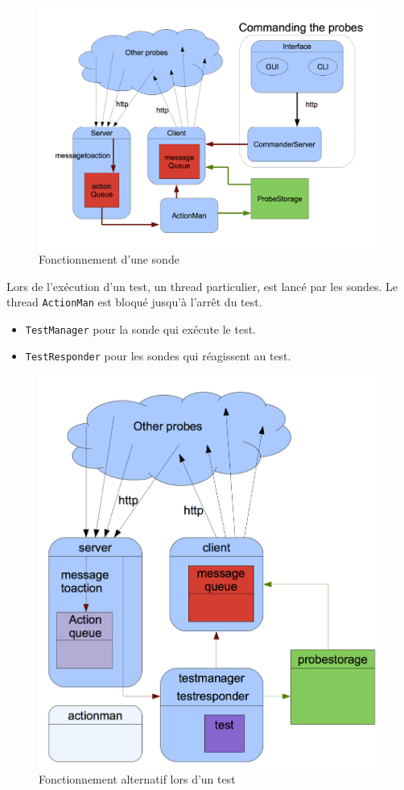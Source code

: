 \documentclass[a4paper,11pt]{article}
\newcommand{\cd}[1]{\texttt{#1}}
\begin{document}
\begin{figure}[!ht]
\centering\includegraphics[width=\linewidth]{img/graphCommander.png}
\caption{Fonctionnement d'une sonde}
\end{figure}


Lors de l'exécution d'un test, un thread particulier, est lancé par les sondes. Le thread \cd{ActionMan} est bloqué jusqu'à l'arrêt du test.
\begin{itemize}
\item \cd{TestManager} pour la sonde qui exécute le test.
\item \cd{TestResponder} pour les sondes qui réagissent au test.
\end{itemize}

\begin{figure}[!ht]
\centering\includegraphics[width=\linewidth]{img/graphTest.png}
\caption{Fonctionnement alternatif lors d'un test}
\end{figure}
\end{document}
